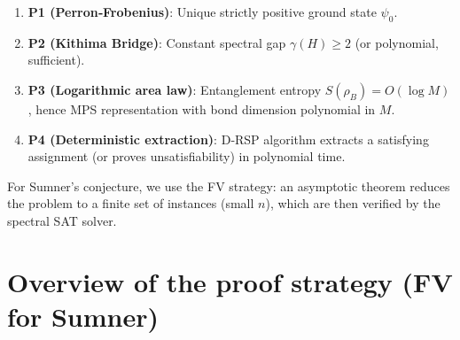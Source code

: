 \documentclass[11pt,a4paper]{article}
\begin{document}
\begin{enumerate}
\item \textbf{P1 (Perron‑Frobenius)}: Unique strictly positive ground state $\psi_0$.
\item \textbf{P2 (Kithima Bridge)}: Constant spectral gap $\gamma(H) \ge 2$ (or polynomial, sufficient).
\item \textbf{P3 (Logarithmic area law)}: Entanglement entropy $S(\rho_B)=O(\log M)$, hence MPS representation with bond dimension polynomial in $M$.
\item \textbf{P4 (Deterministic extraction)}: D‑RSP algorithm extracts a satisfying assignment (or proves unsatisfiability) in polynomial time.
\end{enumerate}

For Sumner's conjecture, we use the FV strategy: an asymptotic theorem reduces the problem to a finite set of instances (small $n$), which are then verified by the spectral SAT solver.

\section{Overview of the proof strategy (FV for Sumner)}
\end{document}
